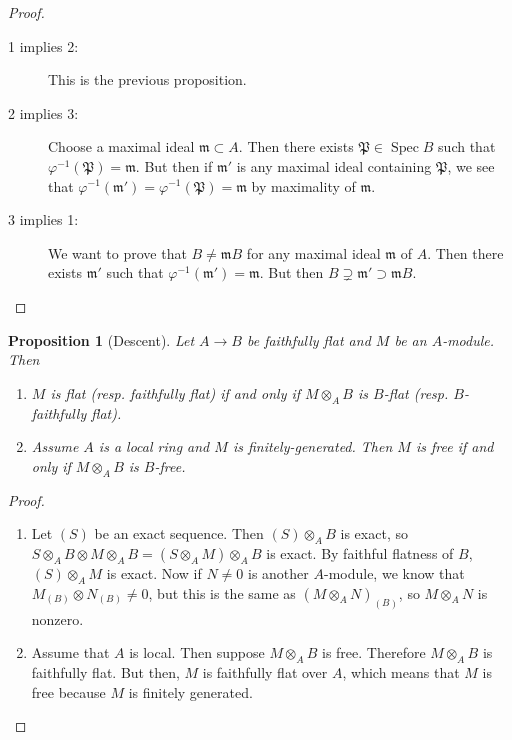 \documentclass[leqno, openany]{memoir}
\newtheorem{prop}[thm]{Proposition}
\theoremstyle{definition}
\theoremstyle{remark}
\theoremstyle{plain}
\theoremstyle{definition}
\theoremstyle{remark}
\newcommand{\mf}[1]{\mathfrak{#1}}
\DeclareMathOperator{\Spec}{Spec}
\begin{document}
\begin{proof}
    \begin{description}
        \item[1 implies 2:] This is the previous proposition.
        \item[2 implies 3:] Choose a maximal ideal $\mf{m} \subset A$. Then there exists $\mf{P} \in \Spec B$ such that $\varphi^{-1}(\mf{P}) = \mf{m}$. But then if $\mf{m}'$ is any maximal ideal containing $\mf{P}$, we see that $\varphi^{-1}(\mf{m}') = \varphi^{-1}(\mf{P}) = \mf{m}$ by maximality of $\mf{m}$.
        \item[3 implies 1:] We want to prove that $B \neq \mf{m}B$ for any maximal ideal $\mf{m}$ of $A$. Then there exists $\mf{m}'$ such that $\varphi^{-1}(\mf{m}') = \mf{m}$. But then $B \supsetneq \mf{m}' \supset \mf{m}B$. \qedhere
    \end{description}
\end{proof}

\begin{prop}[Descent]
    Let $A \to B$ be faithfully flat and $M$ be an $A$-module. Then
    \begin{enumerate}
        \item $M$ is flat (resp. faithfully flat) if and only if $M \otimes_A B$ is $B$-flat (resp. $B$-faithfully flat).
        \item Assume $A$ is a local ring and $M$ is finitely-generated. Then $M$ is free if and only if $M \otimes_A B$ is $B$-free.
    \end{enumerate}
\end{prop}

\begin{proof}
    \begin{enumerate}
        \item Let $(S)$ be an exact sequence. Then $(S) \otimes_A B$ is exact, so $S \otimes_A B \otimes M \otimes_A B = (S \otimes_A M) \otimes_A B$ is exact. By faithful flatness of $B$, $(S) \otimes_A M$ is exact. Now if $N \neq 0$ is another $A$-module, we know that $M_{(B)} \otimes N_{(B)} \neq 0$, but this is the same as $(M \otimes_A N)_{(B)}$, so $M \otimes_A N$ is nonzero.
        \item Assume that $A$ is local. Then suppose $M \otimes_A B$ is free. Therefore $M \otimes_A B$ is faithfully flat. But then, $M$ is faithfully flat over $A$, which means that $M$ is free because $M$ is finitely generated. \qedhere
    \end{enumerate}
\end{proof}
\end{document}
